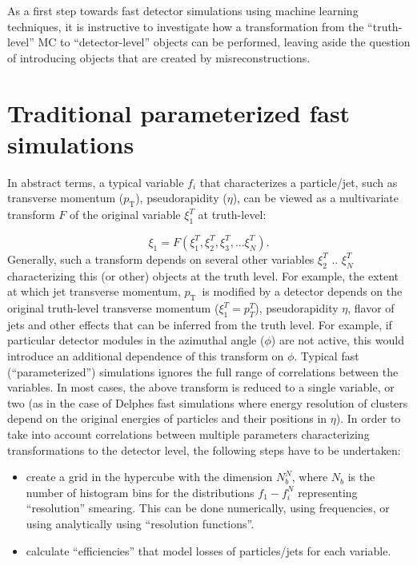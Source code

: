 \documentclass[showpacs,showkeys,preprint,prd,nofootinbib,linenumbers,12pt]{revtex4-1}
\def\pt{\ensuremath{p_{\mathrm{T}}}}
\begin{document}
As a first step towards fast detector simulations using machine learning techniques, it is instructive to investigate how a transformation from the ``truth-level'' MC to ``detector-level'' objects can be performed, leaving aside the question of introducing objects that are created by misreconstructions.

\section{Traditional parameterized fast simulations}

In abstract terms, a typical variable $f_i$ that characterizes a particle/jet, such as transverse momentum (\pt), pseudorapidity ($\eta$), can be viewed as a  multivariate transform $F$ of the original variable $\xi_1^T$ at truth-level:

$$
\xi_1 = F (\xi_1^T, \xi_2^T, \xi_3^T, ...\xi_N^T).
$$
Generally, such a transform  depends on several other variables $\xi_2^T$ ..  $\xi_N^T$ characterizing this (or other) objects at the truth level.   For example, the extent at which jet transverse momentum, \pt\ is modified  by a detector depends on the original truth-level transverse momentum ($\xi_1^T=p_T^T$), pseudorapidity $\eta$,  flavor of jets and other effects that can be inferred from the truth level. For example, if particular detector modules in the azimuthal angle ($\phi$) are not active, this would introduce an additional dependence of this transform on $\phi$.
Typical fast (``parameterized'') simulations ignores the full range of correlations between the variables. In most cases, the above transform is reduced to a single variable, or two (as in the case of Delphes fast simulations where energy resolution of clusters depend on the original energies of particles and their positions in $\eta$). In order to take into account correlations between  multiple parameters characterizing transformations to the detector level, the following steps have to be undertaken:

\begin{itemize}

\item
  create a grid in the hypercube with the dimension $N_b^N$, where $N_b$ is the number of histogram bins for the distributions $f_1-f_i^N$  representing ``resolution'' smearing. This can be done numerically, using frequencies, or using analytically using ``resolution functions''.

\item
  calculate ``efficiencies'' that model losses of particles/jets for each variable.

\end{itemize}
\end{document}
